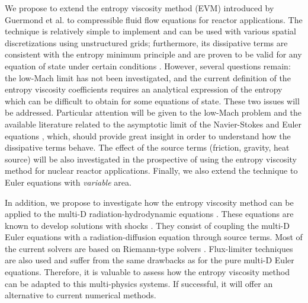 We propose to extend the entropy viscosity method (EVM) introduced by Guermond et al. to compressible fluid flow equations for reactor applications. The technique is relatively simple to implement and can be used with various spatial discretizations using unstructured grids; furthermore, its dissipative terms are consistent with the entropy minimum principle and are proven to be valid for any equation of state under certain conditions \cite{jlg}. However, several questions remain: the low-Mach limit has not been investigated, and the current definition of the entropy viscosity coefficients requires an analytical expression of the entropy which can be difficult to obtain for some equations of state. These two issues will be addressed. Particular attention will be given to the low-Mach problem and the available literature related to the asymptotic limit of the Navier-Stokes \cite{Muller} and Euler equations \cite{LowMach1, LowMach2}, which,  should provide great insight in order to understand how the dissipative terms behave. The effect of the source terms (friction, gravity, heat source) will be also investigated in the prospective of using the entropy viscosity method for nuclear reactor applications. Finally, we also extend the technique to Euler equations with \emph{variable} area.

In addition, we propose to investigate how the entropy viscosity method can be applied to the multi-D radiation-hydrodynamic equations \cite{LowrieMorelHittinger}. These equations are known to develop solutions with shocks \cite{Balsara}. They consist of coupling the multi-D Euler equations with a radiation-diffusion equation through source terms.  Most of the current solvers are based on Riemann-type solvers \cite{LowrieMorel}. Flux-limiter techniques \cite{EdwardsMorelLowrie} are also used and suffer from the same drawbacks as for the pure multi-D Euler equations. Therefore, it is valuable to assess how the entropy viscosity method can be adapted to this multi-physics systems. If successful, it will offer an alternative to current numerical methods.

